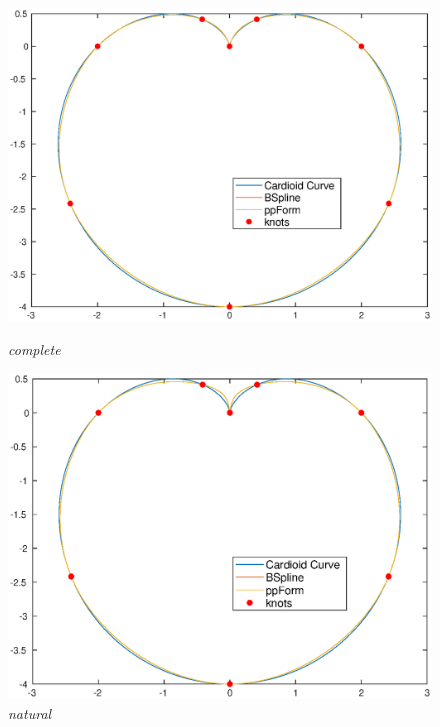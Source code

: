 \documentclass[11pt,en]{elegantpaper}
\begin{document}
\begin{figure}[htbp]
    \centering
    \begin{minipage}[t]{0.4\linewidth}
        \centering
        \includegraphics[width=0.9\linewidth]{figure/curve_cardioid_complete.eps}
        \caption{\textit{complete}}
        \label{fig:side:a}
    \end{minipage}%
    \begin{minipage}[t]{0.4\linewidth}
        \centering
        \includegraphics[width=0.9\linewidth]{figure/curve_cardioid_natural.eps}
        \caption{\textit{natural}}
        \label{fig:side:b}
    \end{minipage}
    \begin{minipage}[t]{0.4\linewidth}
        \centering

\end{minipage}
\end{figure}
\end{document}

